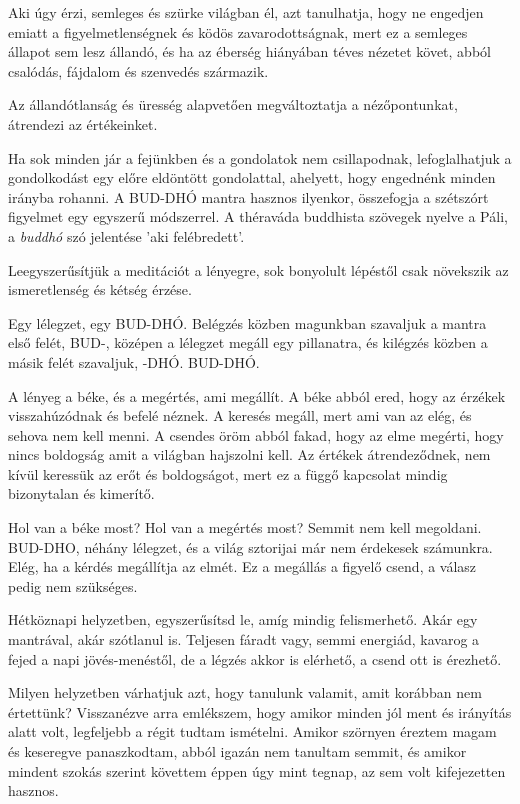 Aki úgy érzi, semleges és szürke világban él, azt tanulhatja, hogy ne
engedjen emiatt a figyelmetlenségnek és ködös zavarodottságnak, mert ez
a semleges állapot sem lesz állandó, és ha az éberség hiányában téves
nézetet követ, abból csalódás, fájdalom és szenvedés származik.

Az állandótlanság és üresség alapvetően megváltoztatja a nézőpontunkat,
átrendezi az értékeinket.

Ha sok minden jár a fejünkben és a gondolatok nem csillapodnak,
lefoglalhatjuk a gondolkodást egy előre eldöntött gondolattal, ahelyett,
hogy engednénk minden irányba rohanni. A BUD-DHÓ mantra hasznos
ilyenkor, összefogja a szétszórt figyelmet egy egyszerű módszerrel. A
théraváda buddhista szövegek nyelve a Páli, a \emph{buddhó} szó
jelentése 'aki felébredett'.

Leegyszerűsítjük a meditációt a lényegre, sok bonyolult lépéstől csak
növekszik az ismeretlenség és kétség érzése.

Egy lélegzet, egy BUD-DHÓ. Belégzés közben magunkban szavaljuk a mantra
első felét, BUD-, középen a lélegzet megáll egy pillanatra, és kilégzés
közben a másik felét szavaljuk, -DHÓ. BUD-DHÓ.

A lényeg a béke, és a megértés, ami megállít. A béke abból ered, hogy az
érzékek visszahúzódnak és befelé néznek. A keresés megáll, mert ami van
az elég, és sehova nem kell menni. A csendes öröm abból fakad, hogy az
elme megérti, hogy nincs boldogság amit a világban hajszolni kell. Az
értékek átrendeződnek, nem kívül keressük az erőt és boldogságot, mert
ez a függő kapcsolat mindig bizonytalan és kimerítő.

Hol van a béke most? Hol van a megértés most? Semmit nem kell megoldani.
BUD-DHO, néhány lélegzet, és a világ sztorijai már nem érdekesek
számunkra. Elég, ha a kérdés megállítja az elmét. Ez a megállás a
figyelő csend, a válasz pedig nem szükséges.

Hétköznapi helyzetben, egyszerűsítsd le, amíg mindig felismerhető. Akár
egy mantrával, akár szótlanul is. Teljesen fáradt vagy, semmi energiád,
kavarog a fejed a napi jövés-menéstől, de a légzés akkor is elérhető, a
csend ott is érezhető.

Milyen helyzetben várhatjuk azt, hogy tanulunk valamit, amit korábban
nem értettünk? Visszanézve arra emlékszem, hogy amikor minden jól ment
és irányítás alatt volt, legfeljebb a régit tudtam ismételni. Amikor
szörnyen éreztem magam és keseregve panaszkodtam, abból igazán nem
tanultam semmit, és amikor mindent szokás szerint követtem éppen úgy
mint tegnap, az sem volt kifejezetten hasznos.

